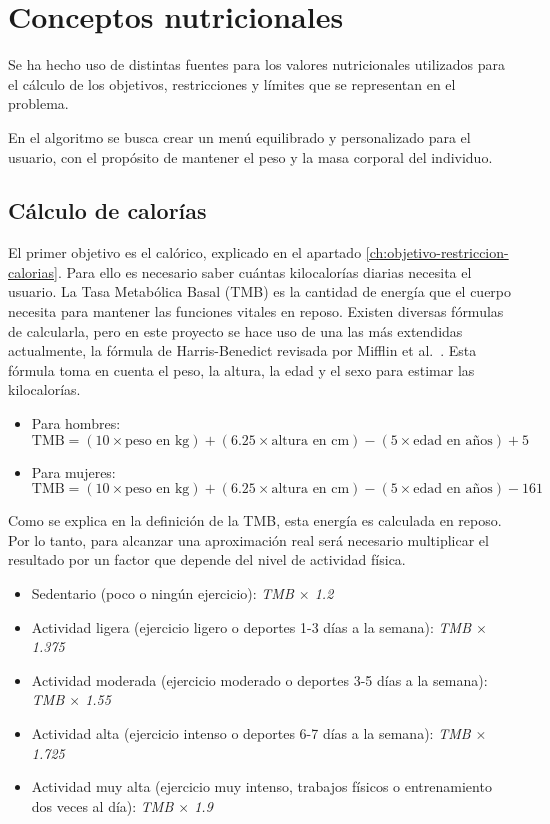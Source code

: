 \section{Conceptos nutricionales}

Se ha hecho uso de distintas fuentes para los valores nutricionales utilizados para el cálculo de los objetivos, restricciones y límites que se representan en el problema.

En el algoritmo se busca crear un menú equilibrado y personalizado para el usuario, con el propósito de mantener el peso y la masa corporal del individuo.

\subsection{Cálculo de calorías}
\label{ch:calculo-calorias}

El primer objetivo es el calórico, explicado en el apartado \ref{ch:objetivo-restriccion-calorias}. Para ello es necesario saber cuántas kilocalorías diarias necesita el usuario. La Tasa Metabólica Basal (TMB) es la cantidad de energía que el cuerpo necesita para mantener las funciones vitales en reposo. Existen diversas fórmulas de calcularla, pero en este proyecto se hace uso de una las más extendidas actualmente, la fórmula de Harris-Benedict revisada por Mifflin et al.~\cite{mifflin1990}. Esta fórmula toma en cuenta el peso, la altura, la edad y el sexo para estimar las kilocalorías.

\begin{itemize}
    \item Para hombres:
    \[
    \text{TMB} = (10 \times \text{peso en kg}) + (6.25 \times \text{altura en cm}) - (5 \times \text{edad en años}) + 5
    \]
    \item Para mujeres:
    \[
    \text{TMB} = (10 \times \text{peso en kg}) + (6.25 \times \text{altura en cm}) - (5 \times \text{edad en años}) - 161
    \]
\end{itemize}

Como se explica en la definición de la TMB, esta energía es calculada en reposo. Por lo tanto, para alcanzar una aproximación real será necesario multiplicar el resultado por un factor que depende del nivel de actividad física.~\cite{krause2016}
\newpage
\begin{itemize}
    \item Sedentario (poco o ningún ejercicio): \textit{TMB $\times$ 1.2}
    \item Actividad ligera (ejercicio ligero o deportes 1-3 días a la semana): \textit{TMB $\times$ 1.375}
    \item Actividad moderada (ejercicio moderado o deportes 3-5 días a la semana): \textit{TMB $\times$ 1.55}
    \item Actividad alta (ejercicio intenso o deportes 6-7 días a la semana): \textit{TMB $\times$ 1.725}
    \item Actividad muy alta (ejercicio muy intenso, trabajos físicos o entrenamiento dos veces al día): \textit{TMB $\times$ 1.9}
\end{itemize}


